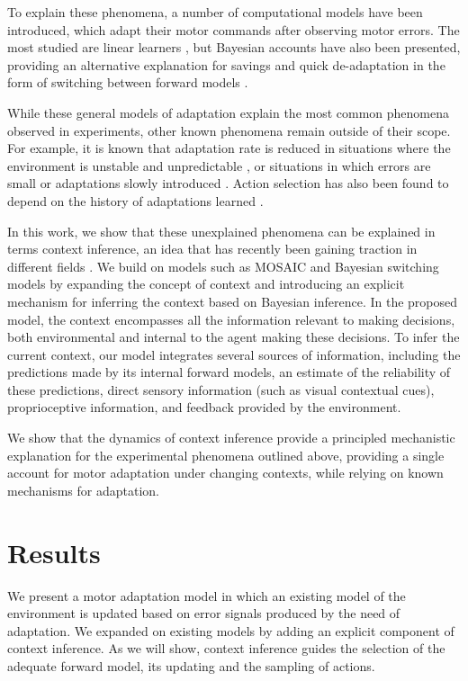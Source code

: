 \documentclass[a4paper,doc,floatsintext,natbib]{apa6}%
\begin{document}
To explain these phenomena, a number of computational models have been introduced, which adapt their motor commands after observing motor errors. The most studied are linear learners \citep{Smith_Interacting_2006,Forano_Timescales_2020,Scheidt_Learning_2001}, but Bayesian accounts have also been presented, providing an alternative explanation for savings and quick de-adaptation in the form of switching between forward models \citep{Kording_Bayesian_2004,Oh_Minimizing_2019}.

While these general models of adaptation explain the most common phenomena observed in experiments, other known phenomena remain outside of their scope. For example, it is known that adaptation rate is reduced in situations where the environment is unstable and unpredictable \citep{Herzfeld_memory_2014}, or situations in which errors are small \citep{Marko_Sensitivity_2012} or adaptations slowly introduced \citep{Huang_Persistence_2009}. Action selection has also been found to depend on the history of adaptations learned \citep{Vaswani_Decay_2013,Davidson_Scaling_2004}.

In this work, we show that these unexplained phenomena can be explained in terms context inference, an idea that has recently been gaining traction in different fields \cite[e.g.][]{Sanders_Hippocampal_2020,Hunter_Contextsensitive_2021}. We build on models such as MOSAIC \citep{Wolpert_Multiple_1998} and Bayesian switching models \citep{Kording_Bayesian_2004,Oh_Minimizing_2019} by expanding the concept of context and introducing an explicit mechanism for inferring the context based on Bayesian inference. In the proposed model, the context encompasses all the information relevant to making decisions, both environmental and internal to the agent making these decisions. To infer the current context, our model integrates several sources of information, including the predictions made by its internal forward models, an estimate of the reliability of these predictions, direct sensory information (such as visual contextual cues), proprioceptive information, and feedback provided by the environment.

We show that the dynamics of context inference provide a principled mechanistic explanation for the experimental phenomena outlined above, providing a single account for motor adaptation under changing contexts, while relying on known mechanisms for adaptation.

\section{Results}
We present a motor adaptation model in which an existing model of the environment is updated based on error signals produced by the need of adaptation. We expanded on existing models \citep{Wolpert_Multiple_1998,Kording_Bayesian_2004,Oh_Minimizing_2019} by adding an explicit component of context inference. As we will show, context inference guides the selection of the adequate forward model, its updating and the sampling of actions.
\end{document}
